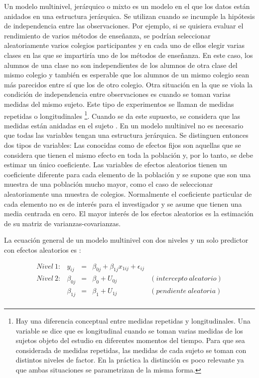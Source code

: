 \documentclass[
  12pt,
  a4paper,
  extrafontsizes,
  onecolumn,
  openright,
  table]{memoir}
\begin{document}
Un modelo multinivel, jerárquico o mixto es un modelo en el que los
datos están anidados en una estructura jerárquica. Se utilizan cuando se
incumple la hipótesis de independencia entre las observaciones. Por
ejemplo, si se quisiera evaluar el rendimiento de varios métodos de
enseñanza, se podrían seleccionar aleatoriamente varios colegios
participantes y en cada uno de ellos elegir varias clases en las que se
impartiría uno de los métodos de enseñanza. En este caso, los alumnos de
una clase no son independientes de los alumnos de otra clase del mismo
colegio y también es esperable que los alumnos de un mismo colegio sean
más parecidos entre sí que los de otro colegio. Otra situación en la que
se viola la condición de independencia entre observaciones es cuando se
toman varias medidas del mismo sujeto. Este tipo de experimentos se
llaman de medidas repetidas o longitudinales \footnote{Hay una
  diferencia conceptual entre medidas repetidas y longitudinales. Una
  variable se dice que es longitudinal cuando se toman varias medidas de
  los sujetos objeto del estudio en diferentes momentos del tiempo. Para
  que sea considerada de medidas repetidas, las medidas de cada sujeto
  se toman con distintos niveles de factor. En la práctica la distinción
  es poco relevante ya que ambas situaciones se parametrizan de la misma
  forma.}. Cuando se da este supuesto, se considera que las medidas
están anidadas en el sujeto \autocite[ver][]{Liu2202}. En un modelo
multinivel no es necesario que todas las variables tengan una estructura
jerárquica. Se distinguen entonces dos tipos de variables: Las conocidas
como de efectos fijos son aquellas que se considera que tienen el mismo
efecto en toda la población y, por lo tanto, se debe estimar un único
coeficiente. Las variables de efectos aleatorios tienen un coeficiente
diferente para cada elemento de la población y se supone que son una
muestra de una población mucho mayor, como el caso de seleccionar
aleatoriamente una muestra de colegios. Normalmente el coeficiente
particular de cada elemento no es de interés para el investigador y se
asume que tienen una media centrada en cero. El mayor interés de los
efectos aleatorios es la estimación de su matriz de
varianzas-covarianzas.

La ecuación general de un modelo multinivel con dos niveles y un solo
predictor con efectos aleatorios es \autocite[ver][pp.~40]{chen2021}:

\[
\begin{aligned}
Nivel\ 1: & y_{ij}     & = & \beta_{0j} + \beta_{1j}x_{1ij} + \epsilon_{ij} \\
Nivel\ 2: & \beta_{0j} & = & \beta_{0} + U_{0j} & (intercepto\ aleatorio) \\
          & \beta_{1j} & = & \beta_{1} + U_{1j} & (pendiente\ aleatoria) \\
\end{aligned}
\]
\end{document}

